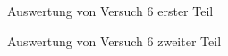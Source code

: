 \documentclass[12pt,a4paper,titlepage,headinclude,bibtotoc]{scrartcl}
\begin{document}
\begin{figure}[h]
\centering
{}
\caption{Auswertung von Versuch 6 erster Teil}
\label{fig:aus61}
\end{figure}
\begin{figure}[h]
\centering
{}
\caption{Auswertung von Versuch 6 zweiter Teil}
\label{fig:aus62}
\end{figure}
\end{document}
